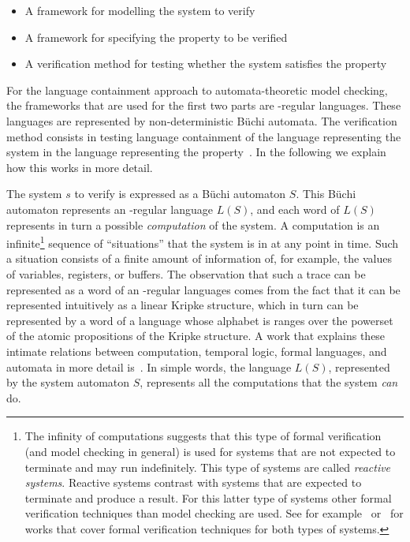 \begin{itemize}
\item A framework for modelling the system to verify
\item A framework for specifying the property to be verified
\item A verification method for testing whether the system satisfies the property
\end{itemize}

For the language containment approach to automata-theoretic model checking, the frameworks that are used for the first two parts are \om-regular languages. These languages are represented by non-deterministic Büchi automata. The verification method consists in testing language containment of the language representing the system in the language representing the property~\cite{1996_vardi,2007_vardi_model_checking}. In the following we explain how this works in more detail.

The system $s$ to verify is expressed as a Büchi automaton $S$. This Büchi automaton represents an \om-regular language $L(S)$, and each word of $L(S)$ represents in turn a possible \textit{computation} of the system. A computation is an infinite\footnote{The infinity of computations suggests that this type of formal verification (and model checking in general) is used for systems that are not expected to terminate and  may run indefinitely. This type of systems are called \textit{reactive systems}. Reactive systems contrast with systems that are expected to terminate and produce a result. For this latter type of systems other formal verification techniques than model checking are used. See for example~\cite{huth2004logic} or~\cite{ben2012mathematical} for works that cover formal verification techniques for both types of systems.} sequence of ``situations'' that the system is in at any point in time. Such a situation consists of a finite amount of information of, for example, the values of variables, registers, or buffers. The observation that such a trace can be represented as a word of an \om-regular languages comes from the fact that it can be represented intuitively as a linear Kripke structure, which in turn can be represented by a word of a language whose alphabet is ranges over the powerset of the atomic propositions of the Kripke structure. A work that explains these intimate relations between computation, temporal logic, formal languages, and automata in more detail is~\cite{1996_vardi}. In simple words, the language $L(S)$, represented by the system automaton $S$, represents all the computations that the system \textit{can} do.

